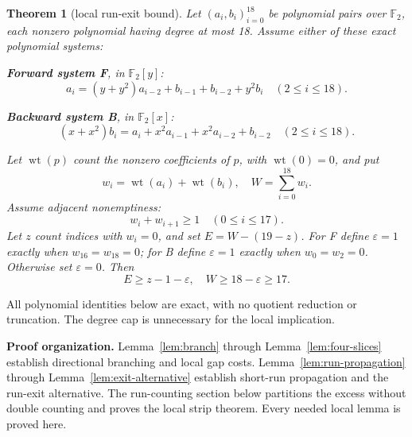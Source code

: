 \documentclass{article}
\newtheorem{theorem}{Theorem}
\DeclareMathOperator{\wt}{wt}
\begin{document}
\begin{theorem}[local run-exit bound]\label{thm:run-exit}
  Let \((a_i, b_i)_{i=0}^{18}\) be polynomial pairs over \(\mathbb{F}_2\), each
  nonzero polynomial having degree at most 18. Assume either of these exact
  polynomial systems:

  \textbf{Forward system F}, in \(\mathbb{F}_2[y]\):
  \begin{equation}\label{eq:forward}
    a_i = (y + y^2) a_{i-2} + b_{i-1} + b_{i-2} + y^2 b_i
    \quad (2 \le i \le 18).
  \end{equation}

  \textbf{Backward system B}, in \(\mathbb{F}_2[x]\):
  \begin{equation}\label{eq:backward}
    (x + x^2) b_i = a_i + x^2 a_{i-1} + x^2 a_{i-2} + b_{i-2}
    \quad (2 \le i \le 18).
  \end{equation}

  Let \(\wt(p)\) count the nonzero coefficients of \(p\), with \(\wt(0) = 0\), and put
  \begin{equation}
    w_i = \wt(a_i) + \wt(b_i), \quad W = \sum_{i=0}^{18} w_i.
  \end{equation}
  Assume adjacent nonemptiness:
  \begin{equation}\label{eq:adjacent}
    w_i + w_{i+1} \ge 1 \quad (0 \le i \le 17).
  \end{equation}
  Let \(z\) count indices with \(w_i = 0\), and set \(E = W - (19 - z)\).
  For F define \(\varepsilon = 1\) exactly when \(w_{16} = w_{18} = 0\); for B define
  \(\varepsilon = 1\) exactly when \(w_0 = w_2 = 0\). Otherwise set \(\varepsilon = 0\).
  Then
  \begin{equation}\label{eq:main-bound}
    E \ge z - 1 - \varepsilon, \quad W \ge 18 - \varepsilon \ge 17.
  \end{equation}
\end{theorem}

All polynomial identities below are exact, with no quotient reduction or
truncation. The degree cap is unnecessary for the local implication.

\textbf{Proof organization.} Lemma~\ref{lem:branch} through Lemma~\ref{lem:four-slices}
establish directional branching and local gap costs. Lemma~\ref{lem:run-propagation} through
Lemma~\ref{lem:exit-alternative} establish short-run propagation and the run-exit
alternative. The run-counting section below partitions the excess without double counting and
proves the local strip theorem. Every needed local lemma is proved here.
\end{document}
